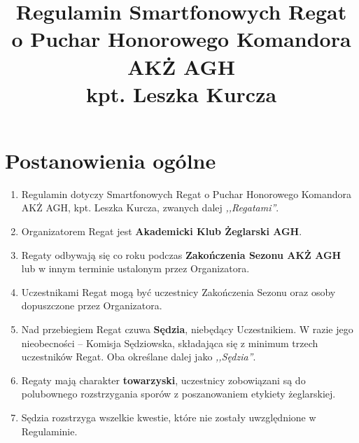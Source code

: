 \documentclass[12pt,a4paper]{article}
\title{\huge Regulamin \textbf{Smartfonowych Regat}\\
\Large o Puchar Honorowego Komandora AKŻ AGH\\
kpt. Leszka Kurcza}
\date{}
\author{}
\begin{document}
\maketitle



\section{Postanowienia ogólne}
\begin{enumerate}
    \item Regulamin dotyczy Smartfonowych Regat o Puchar Honorowego Komandora AKŻ AGH, kpt. Leszka Kurcza, zwanych dalej \textit{,,Regatami''}.
    \item Organizatorem Regat jest \textbf{Akademicki Klub Żeglarski AGH}.
    \item Regaty odbywają się co roku podczas \textbf{Zakończenia Sezonu AKŻ AGH} lub w innym terminie ustalonym przez Organizatora.
    \item Uczestnikami Regat mogą być uczestnicy Zakończenia Sezonu oraz osoby dopuszczone przez Organizatora.
    \item Nad przebiegiem Regat czuwa \textbf{Sędzia}, niebędący Uczestnikiem.
    W razie jego nieobecności -- Komisja Sędziowska, składająca się z minimum trzech uczestników Regat. Oba określane dalej jako \textit{,,Sędzia''}.
    \item Regaty mają charakter \textbf{towarzyski}, uczestnicy zobowiązani są do polubownego rozstrzygania sporów z poszanowaniem etykiety żeglarskiej.
    \item Sędzia rozstrzyga wszelkie kwestie, które nie zostały uwzględnione w Regulaminie.
\end{enumerate}
\end{document}
